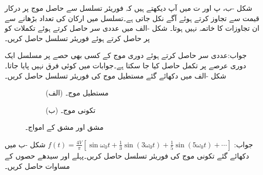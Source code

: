 شکل -ب، پ اور ت میں آپ دیکھتے ہیں کہ فوریئر تسلسل سے حاصل موج  پر درکار قیمت سے تجاوز کرتے ہوئے آگے نکل جاتی ہے۔تسلسل میں ارکان کی تعداد بڑھانے سے ان تجاوزات کا خاتمہ نہیں ہوتا۔
شکل -الف میں عددی سر حاصل کرتے ہوئے تکملات کو  پر حاصل کرتے ہوئے فوریئر تسلسل حاصل کریں۔

جواب:عددی سر حاصل کرتے ہوئے دوری موج کے کسی بھی حصے پر مسلسل ایک دوری عرصے پر تکمل حاصل کیا جا سکتا ہے۔جوابات میں کوئی فرق نہیں پایا جاتا۔
شکل -الف میں دکھائے گئے مستطیل موج کی فوریئر تسلسل حاصل کریں۔
\begin{figure}
\centering
\begin{subfigure}{0.5\textwidth}
\centering
{}
\caption*{(الف) مستطیل موج۔}
\end{subfigure}%
\begin{subfigure}{0.5\textwidth}
\centering
{}
\caption*{(ب) تکونی موج۔}
\end{subfigure}
\caption{مشق  اور مشق  کے امواج۔}
\label{شکل_فوریئر_مشق_مستطیل}
\end{figure}

جواب:
$f(t)=\frac{4V}{\pi}\left[\sin \omega_0 t+\frac{1}{3}\sin(3\omega_0 t)+\frac{1}{5}\sin(5\omega_0 t)+\cdots\right]$
شکل -ب میں دکھائے گئے تکونی موج کی فوریئر تسلسل حاصل کریں۔پہلے  اور 
 سیدھے حصوں کے مساوات حاصل کریں۔

